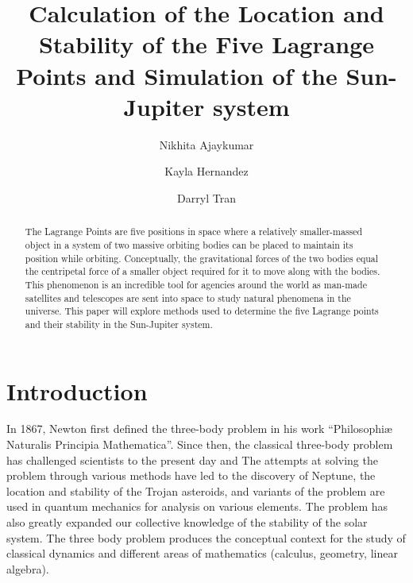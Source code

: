 \documentclass[linenumbers,RNAAS,trackchanges]{aastex631}
\begin{document}
\title{Calculation of the Location and Stability of the Five Lagrange Points and Simulation of the Sun-Jupiter system}
\correspondingauthor{}
\author{Nikhita Ajaykumar}

\author{Kayla Hernandez}


\author{Darryl Tran}

\begin{abstract}
The Lagrange Points are five positions in space where a relatively smaller-massed object in a system of two massive orbiting bodies can be placed to maintain its position while orbiting. Conceptually, the gravitational forces of the two bodies equal the centripetal force of a smaller object required for it to move along with the bodies. This phenomenon is an incredible tool for agencies around the world as man-made satellites and telescopes are sent into space to study natural phenomena in the universe. This paper will explore methods used to determine the five Lagrange points and their stability in the Sun-Jupiter system.
\end{abstract}

\section{Introduction} \label{sec:intro}
In 1867, Newton first defined the three-body problem in his work “Philosophiæ Naturalis Principia Mathematica”. Since then, the classical three-body problem has challenged scientists to the present day and The attempts at solving the problem through various methods have led to the discovery of Neptune, the location and stability of the Trojan asteroids, and variants of the problem are used in quantum mechanics for analysis on various elements. The problem has also greatly expanded our collective knowledge of the stability of the solar system. The three body problem produces the conceptual context for the study of classical dynamics and different areas of mathematics (calculus, geometry, linear algebra).\cite{unknown}
\end{document}
